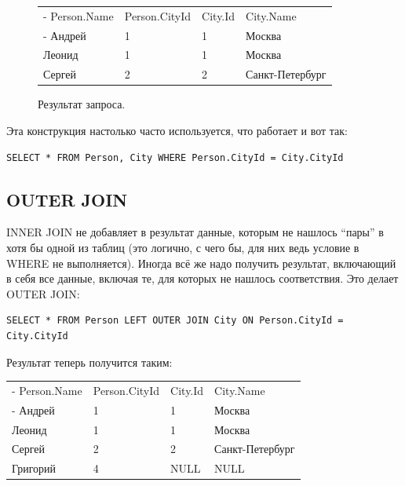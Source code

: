 \documentclass[a5paper]{article}
\begin{document}
\begin{figure}
	\begin{center}
		\begin{tabu}{| X[1 l p] | X[1 l p] | X[1 l p] | X[1 l p]  |}
			\tabucline-
			Person.Name  & Person.CityId  & City.Id  & City.Name       \\
			\tabucline-
			\everyrow{\tabucline-}
			Андрей       & 1              & 1        & Москва          \\
			Леонид       & 1              & 1        & Москва          \\
			Сергей       & 2              & 2        & Санкт-Петербург \\
		\end{tabu}
	\end{center}
	\caption{Результат запроса.}
	\label{table:citiesPeople}
\end{figure}

Эта конструкция настолько часто используется, что работает и вот так:

\begin{verbatim}
SELECT * FROM Person, City WHERE Person.CityId = City.CityId
\end{verbatim}

\subsection{OUTER JOIN}

INNER JOIN не добавляет в результат данные, которым не нашлось ``пары'' в хотя бы одной из таблиц (это логично, с чего бы, для них ведь условие в WHERE не выполняется). Иногда всё же надо получить результат, включающий в себя все данные, включая те, для которых не нашлось соответствия. Это делает OUTER JOIN:

\begin{verbatim}
SELECT * FROM Person LEFT OUTER JOIN City ON Person.CityId = City.CityId
\end{verbatim}

Результат теперь получится таким:

\begin{center}
	\begin{tabu}{| X[1 l p] | X[1 l p] | X[1 l p] | X[1 l p] |}
		\tabucline-
		Person.Name  & Person.CityId  & City.Id  & City.Name       \\
		\tabucline-
		\everyrow{\tabucline-}
		Андрей       & 1              & 1        & Москва          \\
		Леонид       & 1              & 1        & Москва          \\
		Сергей       & 2              & 2        & Санкт-Петербург \\
		Григорий     & 4              & NULL     & NULL            \\
	\end{tabu}
\end{center}
\end{document}
